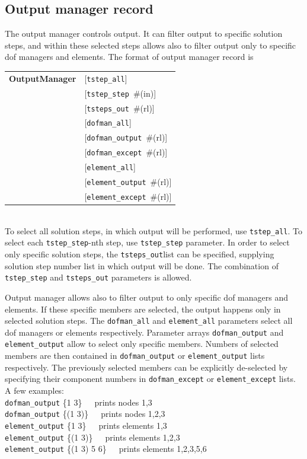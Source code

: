\documentclass[a4paper]{article}
\makeatletter
\newcommand{\param}[1]{\texttt{#1}} %
\newcommand{\optional}[1]{[#1]} %
\newcommand{\field}[2]{\param{#1}~\#{\tiny(#2)}} %
\newcommand{\optField}[2]{\optional{\field{#1}{#2}}}
\newcommand{\fieldnotype}[1]{\param{#1}}
\newcommand{\entKeywordInst}[1]{\textbf{#1}} %
\newenvironment{record}[1][]{\begin{tabular}{|ll}}{\end{tabular}\\}
\newcommand{\recentry}[2]{{#1}&{#2}\\}
\newcounter{rcc}
\newenvironment{record}[1][\textwidth]{\setcounter{rcc}{0}\begin{tabular*}{#1}{|ll@{\extracolsep{\fill}}r}}{\end{tabular*}\\}
\newcommand{\recentry}[2]{\ifthenelse{\value{rcc}>0}{&$\backslash$ \\}{\setcounter{rcc}{1}}{#1}&{#2}}
\makeatother
\begin{document}
\subsection{Output manager record}
\label{_OutputManagerRecord}
The output manager controls output. It can filter output to specific
solution steps, and within these selected steps allows also to filter
output only to specific dof managers and elements. The format of
output manager record is \\
\begin{record}
  \recentry{\entKeywordInst{OutputManager}}{[\fieldnotype{tstep\_all}]}
  \recentry{}{\optField{tstep\_step}{in}}
  \recentry{}{\optField{tsteps\_out}{rl}}
  \recentry{}{[\fieldnotype{dofman\_all}]}
  \recentry{}{\optField{dofman\_output}{rl}}
  \recentry{}{\optField{dofman\_except}{rl}}
  \recentry{}{[\fieldnotype{element\_all}]}
  \recentry{}{\optField{element\_output}{rl}}
  \recentry{}{\optField{element\_except}{rl}}
\end{record}
To select all solution steps, in which output will be performed, use
\param{tstep\_all}. To select each \param{tstep\_step}-nth step, use
\param{tstep\_step} parameter. In order to select only specific
solution steps, the \param{tsteps\_out}list can be specified,
supplying solution step number list in which output will be done.
The combination of \param{tstep\_step} and
\param{tsteps\_out} parameters is allowed.

Output manager allows also to filter output to only specific dof
managers and elements. If these specific members are selected, the
output happens only in selected solution steps.
The \param{dofman\_all} and \param{element\_all} parameters select
all dof managers or elements respectively. Parameter arrays
\param{dofman\_output} and \param{element\_output} allow to select
only specific members. Numbers of selected members are then contained
in \param{dofman\_output} or \param{element\_output} lists
respectively. The previously selected members can be explicitly
de-selected by specifying their component numbers in \param{dofman\_except} or
\param{element\_except} lists. A few examples:\\
\param{dofman\_output} \{1 3\}~~~prints nodes 1,3\\
\param{dofman\_output} \{(1 3)\}~~~prints nodes 1,2,3\\
\param{element\_output} \{1 3\}~~~prints elements 1,3\\
\param{element\_output} \{(1 3)\}~~~prints elements 1,2,3\\
\param{element\_output} \{(1 3) 5 6\}~~~prints elements 1,2,3,5,6\\
\end{document}
